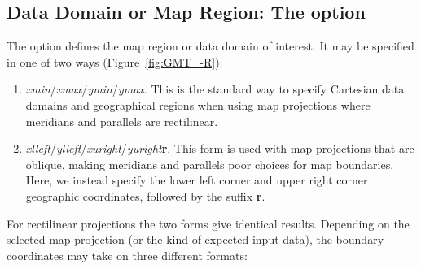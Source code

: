 \subsection{Data Domain or Map Region: The  option}
\label{sec:R}

The  option defines the map region or data domain of interest.  It may be specified
in one of two ways (Figure~\ref{fig:GMT_-R}):
\begin{enumerate}
\item {}\emph{xmin}/\emph{xmax}/\emph{ymin}/\emph{ymax}.  This is the standard way to specify
Cartesian data domains and geographical regions when using map projections where meridians and
parallels are rectilinear.
\item {}\emph{xlleft}/\emph{ylleft}/\emph{xuright}/\emph{yuright}\textbf{r}.
This form is used with map projections that are oblique, making meridians and parallels poor
choices for map boundaries.  Here, we instead specify the lower left corner and upper right
corner geographic coordinates, followed by the suffix \textbf{r}.
\end{enumerate}
For rectilinear projections the two forms give identical results.  Depending on the selected map
projection (or the kind of expected input data), the boundary coordinates may take on three different
formats:


